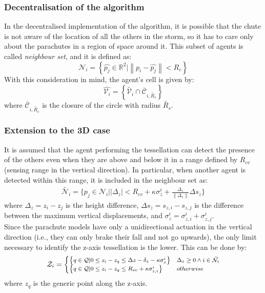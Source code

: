    \subsubsection{Decentralisation of the algorithm} 
    In the decentralised implementation of the algorithm, it is possible that the chute is not aware of the location of all the others in the storm, so it has to care only about the parachutes in a region of space around it. This subset of agents is called \textit{neighbour set}, and it is defined as:
    \begin{equation}
            \mathcal{N}_i = \left\{\hat{p_j} \in \mathbb{R}^2 \lvert \left\lVert p_i-\hat{p_j} \right\rVert < R_{c} \right\}
            \label{eq:neighbour_set}
        \end{equation}
    With this consideration in mind, the agent's cell is given by:
        \begin{equation}
            \hat{\mathcal{V}_i}=\left\{\tilde{\mathcal{V}_i} \cap \bar{\mathcal{C}}_{i, \tilde{R_s}} \right\}
        \end{equation}
    where $\bar{\mathcal{C}}_{i, \tilde{R_s}}$ is the closure of the circle with radius $\tilde{R_s}$.  
    
    \subsubsection{Extension to the 3D case}  
    It is assumed that the agent performing the tessellation can detect the presence of the others even when they are above and below it in a range defined by $R_{cv}$ (sensing range in the vertical direction). In particular, when another agent is detected within this range, it is included in the neighbour set as:
    \begin{gather}
        \tilde{\mathcal{N}_i} = \{p_j \in \mathcal{N}_{i} \lvert \lvert \Delta_z \lvert < R_{cv} + \kappa \sigma_z^i
        + \frac{\Delta_z}{\lVert \Delta_z \lVert }\Delta s_z\} %
        \label{eq:neighbour_set_Voronoi}
    \end{gather}
    where $\Delta_z=z_i - z_j$ is the height difference, $\Delta s_z = s_{z, i} - s_{z,j}$ is the difference between the maximum vertical displacements, and $\sigma_z^i=\sigma_{z,i}^i + \sigma_{z, j}^i$.\\
    Since the parachute models have only a unidirectional actuation in the vertical direction (i.e., they can only brake their fall and not go upwards), the only limit necessary to identify the z-axis tessellation is the lower. This can be done by:
    \begin{equation}
    {\scriptsize
        \mathcal{Z}_i = 
        \begin{cases}
            \left\{q\in \mathcal{Q} \lvert 0 \le z_i-z_q \le \Delta z - \delta_z - \kappa \sigma_z^i \right\}& \Delta_z \ge 0 \wedge i \in \tilde{\mathcal{N}_i} \\
            \left\{q \in \mathcal{Q} \lvert 0 \le z_i-z_q
            \le R_{sv} + \kappa \sigma_{z, i}^i \right\} & otherwise
        \end{cases}   } 
    \end{equation}
    where $z_q$ is the generic point along the z-axis.
   
